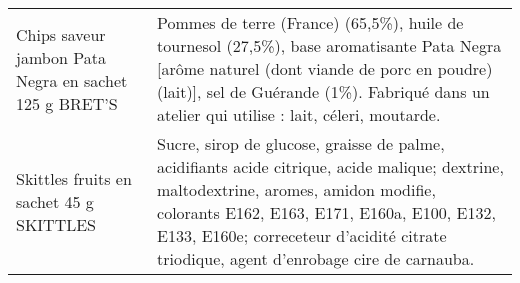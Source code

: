 \begin{longtable}{p{5cm}p{10cm}}
                                                    Chips saveur jambon Pata Negra en sachet 125 g BRET'S &                                                                                                                                                                                                                                                                                                                                                                                                                                                                                                                                                                                                                                                                                                                                                                                                 Pommes de terre (France) (65,5\%), huile de tournesol (27,5\%), base aromatisante Pata Negra [arôme naturel (dont viande de porc en poudre) (lait)], sel de Guérande (1\%).  Fabriqué dans un atelier qui utilise : lait, céleri, moutarde. \\
                                                                  Skittles fruits en sachet 45 g SKITTLES &                                                                                                                                                                                                                                                                                                                                                                                                                                                                                                                                                                                                                                                                                                                                                           Sucre, sirop de glucose, graisse de palme, acidifiants acide citrique, acide malique; dextrine, maltodextrine, aromes, amidon modifie, colorants E162, E163, E171, E160a, E100, E132, E133, E160e; correceteur d'acidité citrate triodique, agent d'enrobage cire de carnauba. \\

\end{longtable}

